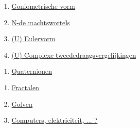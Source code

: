 \documentclass{ximera}
\begin{document}
    \begin{enumerate}
    \item \hyperref[xim:complexe_getallen_gonio]{Goniometrische vorm}
    \item \hyperref[xim:complexe_getallen_wortels]{N-de machtswortels}
    \item \hyperref[xim:complexe_getallen_euler]{(U) Eulervorm}
    \item \hyperref[xim:complexe_getallen_complexe_veeltermen]{(U) Complexe tweededraagsvergelijkingen}
    \end{enumerate}



    \begin{enumerate}
        
        \item \hyperref[xim:complexe_getallen_quaternionen]{Quaternionen}
    \end{enumerate}
    
    
    \begin{enumerate}
        \item \hyperref[xim:complexe_getallen_fractalen]{Fractalen}
        \item \hyperref[xim:complexe_getallen_golven]{Golven}
        \item \hyperref[xim:complexe_getallen_xxx]{Computers, elektriciteit, ... ?}
    \end{enumerate}
\end{document}
